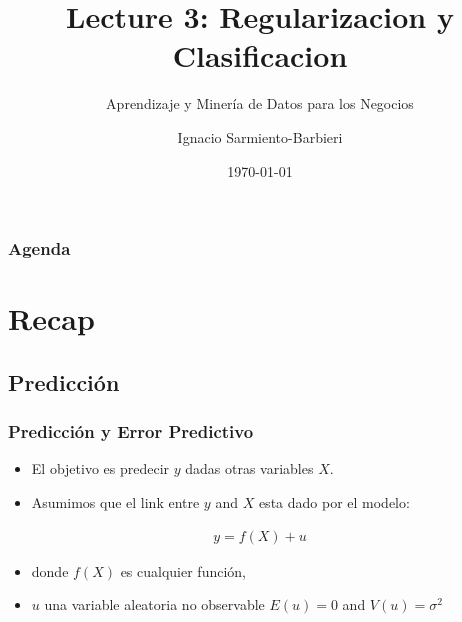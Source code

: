 \documentclass[
  shownotes,
  xcolor={svgnames},
  hyperref={colorlinks,citecolor=DarkBlue,linkcolor=DarkRed,urlcolor=DarkBlue}
  , aspectratio=169]{beamer}
\begin{document}
\title{Lecture 3:  Regularizacion y Clasificacion}
\subtitle{Aprendizaje y Minería de Datos para los Negocios}
\date{\today}

\author[Sarmiento-Barbieri]{Ignacio Sarmiento-Barbieri}


\begin{frame}[noframenumbering]
\maketitle
\end{frame}





\begin{frame}
\frametitle{Agenda}

\tableofcontents


\end{frame}
\section{Recap} 
\subsection{Predicción} 
\begin{frame}
\frametitle{Predicción y Error Predictivo}


\begin{itemize}
  \item El objetivo es predecir $y$ dadas otras variables $X$. 
  \bigskip
  \item Asumimos que el link entre $y$ and $X$ esta dado por el modelo:
\end{itemize}
\bigskip
\begin{align}
  y = f(X) + u
\end{align}
\bigskip
\begin{itemize}
  \item donde $f(X)$ es cualquier función, 
  \bigskip
  \item  $u$ una variable aleatoria no observable $E(u)=0$ and $V(u) = \sigma^2$
\end{itemize}


\end{frame}
\end{document}

